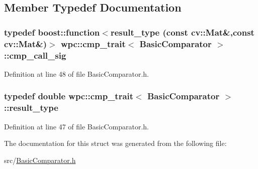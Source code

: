 \subsection{Member Typedef Documentation}
\hypertarget{structwpc_1_1cmp__trait_3_01_basic_comparator_01_4_a9712f56416054a0f465550d39436a9b1}{
\subsubsection[{cmp\-\_\-call\-\_\-sig}]{\setlength{\rightskip}{0pt plus 5cm}typedef boost\-::function$<${\bf result\-\_\-type} (const cv\-::\-Mat\&,const cv\-::\-Mat\&)$>$ {\bf wpc\-::cmp\-\_\-trait}$<$ {\bf Basic\-Comparator} $>$\-::{\bf cmp\-\_\-call\-\_\-sig}}}\label{structwpc_1_1cmp__trait_3_01_basic_comparator_01_4_a9712f56416054a0f465550d39436a9b1}


Definition at line 48 of file Basic\-Comparator.\-h.

\hypertarget{structwpc_1_1cmp__trait_3_01_basic_comparator_01_4_a2154be1a27ddbf1add7bb47beb275c5a}{
\subsubsection[{result\-\_\-type}]{\setlength{\rightskip}{0pt plus 5cm}typedef double {\bf wpc\-::cmp\-\_\-trait}$<$ {\bf Basic\-Comparator} $>$\-::{\bf result\-\_\-type}}}\label{structwpc_1_1cmp__trait_3_01_basic_comparator_01_4_a2154be1a27ddbf1add7bb47beb275c5a}


Definition at line 47 of file Basic\-Comparator.\-h.



The documentation for this struct was generated from the following file\-:\begin{DoxyCompactItemize}
\item 
src/\hyperlink{_basic_comparator_8h}{Basic\-Comparator.\-h}\end{DoxyCompactItemize}

